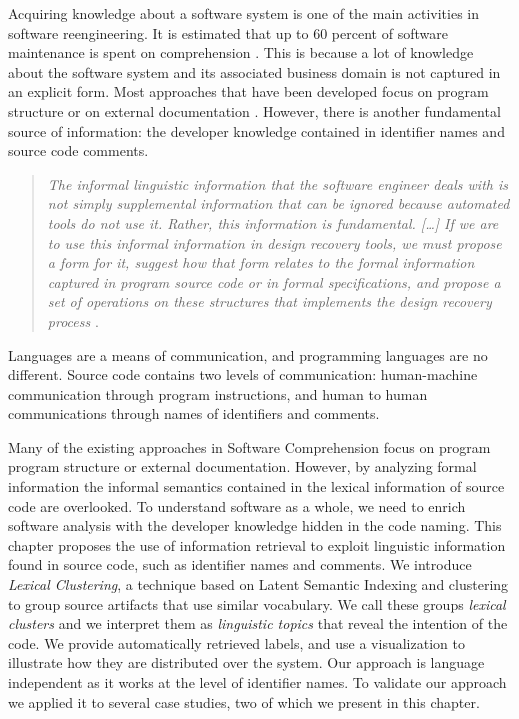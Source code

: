 \asteriskasteriskasterisk

Acquiring knowledge about a software system is one of the main activities in software reengineering. It is estimated that up to 60 percent of software maintenance is spent on comprehension \cite{Abra04a}. This is because a lot of knowledge about the software system and its associated business domain is not captured in an explicit form. Most approaches that have been developed focus on program structure \cite{Duca05b} or on external documentation \cite{Maar91a,Anto02b}. However, there is another fundamental source of information: the developer knowledge contained in identifier names and source code comments.

{\small\begin{quotation}\emph{The informal linguistic information that the software engineer deals with is not simply supplemental information that can
be ignored because automated tools do not use it. Rather, this information is fundamental. [\ldots] If we are to use this informal information in design recovery tools, we must propose a form for it, suggest how that form relates to the formal information captured in program source code or in formal specifications, and propose a set of operations on these structures that implements the design recovery process} \cite{Bigg89c}.
\end{quotation}}

Languages are a means of communication, and programming languages are no different. Source code contains two levels of communication: human-machine communication through program instructions, and human to human communications through names of identifiers and comments. 

Many of the existing approaches in Software Comprehension focus on program program structure or external documentation. However, by analyzing formal information the informal semantics contained in the lexical information of source code are overlooked. To understand software as a whole, we need to enrich software analysis with the developer knowledge hidden in the code naming. This chapter proposes the use of information retrieval to exploit linguistic information found in source code, such as identifier names and comments. We introduce \emph{Lexical Clustering}, a technique based on Latent Semantic Indexing and clustering to group source artifacts that use similar vocabulary. We call these groups \emph{lexical clusters} and we interpret them as \emph{linguistic topics} that reveal the intention of the code. We provide automatically retrieved labels, and use a visualization to illustrate how they are distributed over the system. Our approach is language independent as it works at the level of identifier names. To validate our approach we applied it to several case studies, two of which we present in this chapter.

